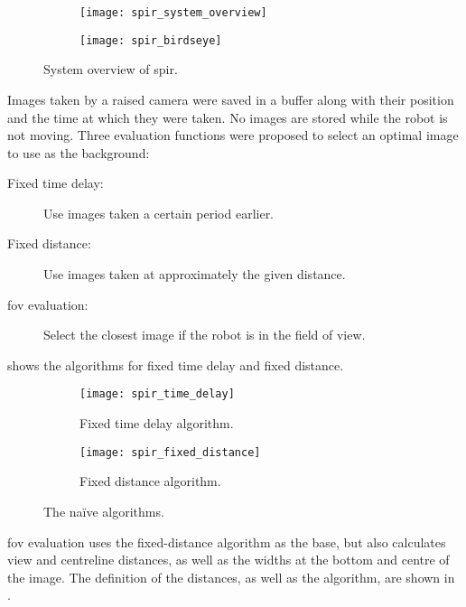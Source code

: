   \begin{figure}[h]
    \centering
    \begin{subfigure}[b]{0.45\textwidth}
      \texttt{[image: spir\_system\_overview]}
    \end{subfigure}
    \hfill
    \begin{subfigure}[b]{0.45\textwidth}
      \texttt{[image: spir\_birdseye]}
    \end{subfigure}
    \caption[SPIR system overview]{System overview of \gls{spir}.\cite{shiroma2004}}
    \label{fig:spir_system_overview}
  \end{figure}

  Images taken by a raised camera were saved in a buffer along with their position and the time at which they were taken.
  No images are stored while the robot is not moving.
  Three evaluation functions were proposed to select an optimal image to use as the background:

  \begin{description}
    \item [Fixed time delay:] Use images taken a certain period earlier.
    \item [Fixed distance:] Use images taken at approximately the given distance.
    \item [\Gls{fov} evaluation:] Select the closest image if the robot is in the field of view.
  \end{description}

   shows the algorithms for fixed time delay and fixed distance.

  \begin{figure}[h]
    \centering
    \begin{subfigure}[b]{0.45\textwidth}
      \texttt{[image: spir\_time\_delay]}
      \caption{Fixed time delay algorithm.}
      \label{fig:spir_time_delay}
    \end{subfigure}
    \hfill
    \begin{subfigure}[b]{0.45\textwidth}
      \texttt{[image: spir\_fixed\_distance]}
      \caption{Fixed distance algorithm.}
      \label{fig:spir_fixed_distance}
    \end{subfigure}
    \caption[SPIR naïve algorithms]{The naïve algorithms.\cite{shiroma2004}}
    \label{fig:spir_naive_algorithms}
  \end{figure}

  \Gls{fov} evaluation uses the fixed-distance algorithm as the base, but also calculates view and centreline distances, as well as the widths at the bottom and centre of the image.
  The definition of the distances, as well as the algorithm, are shown in .

